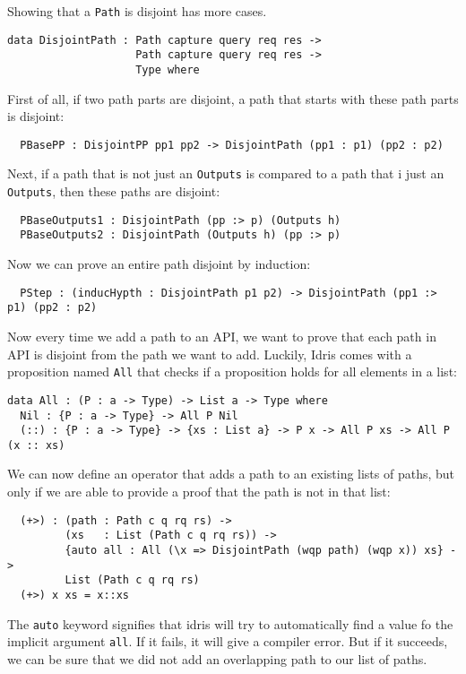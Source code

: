 \documentclass[12pt,a4paper]{article}
\begin{document}
Showing that a \texttt{Path} is disjoint has more cases.
\begin{verbatim}
data DisjointPath : Path capture query req res ->
                    Path capture query req res ->
                    Type where
\end{verbatim}
First of all, if two path parts are disjoint, a path that starts with these path parts is disjoint:
\begin{verbatim}
  PBasePP : DisjointPP pp1 pp2 -> DisjointPath (pp1 : p1) (pp2 : p2)
\end{verbatim}
Next, if a path that is not just an \texttt{Outputs} is compared to a path that i just an \texttt{Outputs}, then these paths are disjoint:
\begin{verbatim}
  PBaseOutputs1 : DisjointPath (pp :> p) (Outputs h)
  PBaseOutputs2 : DisjointPath (Outputs h) (pp :> p)
\end{verbatim}
Now we can prove an entire path disjoint by induction:
\begin{verbatim}
  PStep : (inducHypth : DisjointPath p1 p2) -> DisjointPath (pp1 :> p1) (pp2 : p2)
\end{verbatim}

Now every time we add a path to an API, we want to prove that each path in API is disjoint from the path we want to add. Luckily, Idris comes with a proposition named \texttt{All} that checks if a proposition holds for all elements in a list:
\begin{verbatim}
data All : (P : a -> Type) -> List a -> Type where
  Nil : {P : a -> Type} -> All P Nil
  (::) : {P : a -> Type} -> {xs : List a} -> P x -> All P xs -> All P (x :: xs)
\end{verbatim}

We can now define an operator that adds a path to an existing lists of paths, but only if we are able to provide a proof that the path is not in that list:
\begin{verbatim}
  (+>) : (path : Path c q rq rs) ->
         (xs   : List (Path c q rq rs)) ->
         {auto all : All (\x => DisjointPath (wqp path) (wqp x)) xs} ->
         List (Path c q rq rs)
  (+>) x xs = x::xs
\end{verbatim}
The \texttt{auto} keyword signifies that idris will try to automatically find a value fo the implicit argument \texttt{all}. If it fails, it will give a compiler error. But if it succeeds, we can be sure that we did not add an overlapping path to our list of paths.
\end{document}
